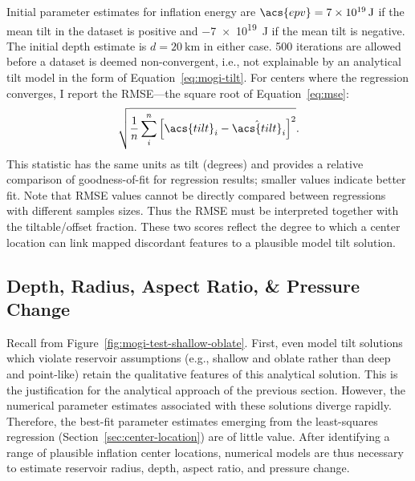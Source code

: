 Initial parameter estimates for inflation energy are $\acs{epv} = \qty{7e19}{\J}$ if the mean tilt in the dataset is positive and \qty{-7e19}{\J} if the mean tilt is negative. The initial depth estimate is $d = \qty{20}{\km}$ in either case. 500 iterations are allowed before a dataset is deemed non-convergent, i.e., not explainable by an analytical tilt model in the form of Equation~\eqref{eq:mogi-tilt}. For centers where the regression converges, I report the \ac{RMSE}---the square root of Equation~\eqref{eq:mse}:
\begin{equation}
    \sqrt{\frac{1}{n}\sum_{i}^{n}{\left[\acs{tilt}_i-\hat{\acs{tilt}}_i\right]}^2}.\label{eq:rmse}
\end{equation}
This statistic has the same units as \acs{tilt} (degrees) and provides a relative comparison of goodness-of-fit for regression results; smaller values indicate better fit. Note that \acs{RMSE} values cannot be directly compared between regressions with different samples sizes. Thus the \acs{RMSE} must be interpreted together with the tiltable/offset fraction. These two scores reflect the degree to which a center location can link mapped discordant features to a plausible model tilt solution.

\subsection{Depth, Radius, Aspect Ratio, \& Pressure Change}

Recall from Figure~\ref{fig:mogi-test-shallow-oblate}. First, even model tilt solutions which violate \textcite{mogi_relations_1958} reservoir assumptions (e.g., shallow and oblate rather than deep and point-like) retain the qualitative features of this analytical solution. This is the justification for the analytical approach of the previous section. However, the numerical parameter estimates associated with these solutions diverge rapidly. Therefore, the best-fit parameter estimates emerging from the least-squares regression (Section~\ref{sec:center-location}) are of little value. After identifying a range of plausible inflation center locations, numerical models are thus necessary to estimate reservoir radius, depth, aspect ratio, and pressure change.

